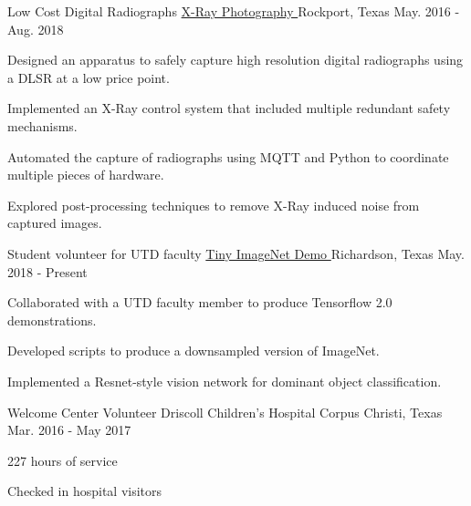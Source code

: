

\begin{cventries}
  \cventry
    {Low Cost Digital Radiographs} %
		{
			\href{https://github.com/TidalPaladin/xray-controller.git}
			{X-Ray Photography \faGithubSquare}
		} %
    {Rockport, Texas} %
    {May. 2016 - Aug. 2018} %
	{
	\begin{cvitems}
		\item {
			Designed an apparatus to safely capture high resolution
			digital radiographs using a DLSR at
			a low price point.
		}
		\item {
			Implemented an X-Ray control system that included multiple
			redundant safety mechanisms.
		}
		\item {
			Automated the capture of radiographs using MQTT and Python
			to coordinate multiple pieces of hardware.
		}
		\item {
			Explored post-processing techniques to remove X-Ray induced
			noise from captured images.
		}
	\end{cvitems}
	}

  \cventry
  	{Student volunteer for UTD faculty} %
		{
			\href{https://github.com/TidalPaladin/tiny-imagenet-demo}
			{Tiny ImageNet Demo \faGithubSquare}
		} %
    {Richardson, Texas} %
  	{May. 2018 - Present} %
	{
	\begin{cvitems}
		\item {
				Collaborated with a UTD faculty member to produce Tensorflow
				2.0 demonstrations.
		}
		\item {
				Developed scripts to produce a downsampled version of
				ImageNet.
		}
		\item {
				Implemented a Resnet-style vision network for dominant object
				classification.
		}
	\end{cvitems}
	}

  \cventry
  	{Welcome Center Volunteer} %
    {Driscoll Children's Hospital} %
    {Corpus Christi, Texas} %
    {Mar. 2016 - May 2017} %
	{
	\begin{cvitems} %
		\item {
			227 hours of service
		}
		\item {
			Checked in hospital visitors
		}
	\end{cvitems}
	}
\end{cventries}
